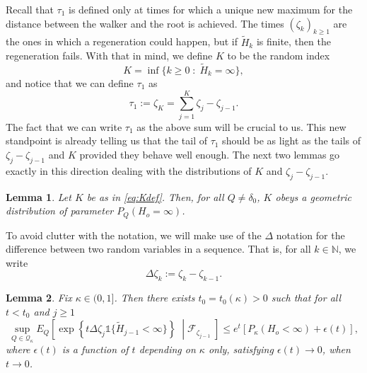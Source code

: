 \documentclass[a4paper]{amsart}
\newtheorem{lemma}{Lemma}
\newcommand{\hitfetak}{\widetilde{H}}
\newcommand{\Lbrace}{\left\lbrace}
\newcommand{\Rbrace}{\right\rbrace}
\begin{document}
Recall that $\tau_1$ is defined only at times for which a unique new maximum for the distance between the walker and the root is achieved. The times $(\zeta_k)_{k \geq 1}$ are the ones in which a regeneration could happen, but if $\tilde{H}_k$ is finite, then the regeneration fails. With that in mind, we define $K$ to be the random index
\begin{equation}\label{eq:Kdef}
    K = \inf\{ k \ge 0 \; : \; \hitfetak_k = \infty\},
\end{equation}
and notice that we can define $\tau_1$ as
\begin{equation}
    \label{eq:tauetakdef}
    \tau_1 := \zeta_{K} = \sum_{j=1}^K\zeta_j -\zeta_{j-1}.
\end{equation}
The fact that we can write $\tau_1$ as the above sum will be crucial to us. This new standpoint is already telling us that the tail of $\tau_1$ should be as light as the tails of $\zeta_j - \zeta_{j-1}$ and $K$ provided they behave well enough. The next two lemmas go exactly in this direction dealing with the distributions of $K$ and $\zeta_j - \zeta_{j-1}$.
\begin{lemma}\label{l:Kdist}Let $K$ be as in \eqref{eq:Kdef}. Then, for all $Q \neq \delta_0$, $K$ obeys a geometric distribution of parameter $P_Q(H_o = \infty)$.
    
\end{lemma}
To avoid clutter with the notation, we will make use of the $\Delta$ notation for the difference between two random variables in a sequence. That is, for all $k \in \mathbb{N}$, we write
\begin{equation}\label{eq:delta}
    \Delta \zeta_k := \zeta_k - \zeta_{k-1}.
\end{equation}
\begin{lemma}\label{l:exp} Fix $\kappa \in (0,1]$. Then there exists $t_0 = t_0(\kappa)>0$ such that for all $t<t_0$ and $j\ge 1$ 
    $$
    \sup_{Q \in \mathcal{Q}_\kappa}E_Q \left[\exp\Lbrace t\Delta \zeta_j \mathds{1}\{\hitfetak_{j-1} < \infty \} \Rbrace \; \middle | \mathcal{F}_{\zeta_{j-1}}\; \right] \le e^{t}\left[P_\kappa(H_o < \infty) + \epsilon(t)\right],
    $$
    where $\epsilon(t)$ is a function of $t$ depending on $\kappa$ only, satisfying $\epsilon(t)\to 0$, when $t\to 0$.

\end{lemma}
\end{document}
